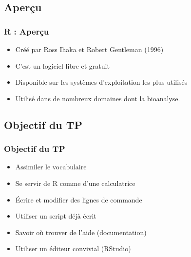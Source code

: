 \documentclass[table,svgnames,hyperref={pdfpagemode=FullScreen}]{beamer}
\begin{document}
\subsection{Aperçu}

\begin{frame}
	\frametitle{R : Aperçu}
	\begin{center}
		\begin{block}{}
			\begin{itemize}
				\item Créé par Ross Ihaka et Robert Gentleman (1996)
				\item C'est un logiciel libre et gratuit
				\item Disponible sur les systèmes d'exploitation les plus utilisés
				\item Utilisé dans de nombreux domaines dont la bioanalyse.
			\end{itemize}
		\end{block}
	\end{center}
\end{frame}

\subsection{Objectif du TP}
\begin{frame}
	\frametitle{Objectif du TP}
		
	\begin{itemize}[<+->]
		\item {Assimiler le vocabulaire }
		\item {Se servir de R comme d'une calculatrice}
		\item {Écrire et modifier des lignes de commande}
		\item {Utiliser un script déjà écrit}
		\item {Savoir où trouver de l'aide (documentation)}
		\item {Utiliser un éditeur convivial (RStudio)}%
	\end{itemize}
\end{frame}
\end{document}
